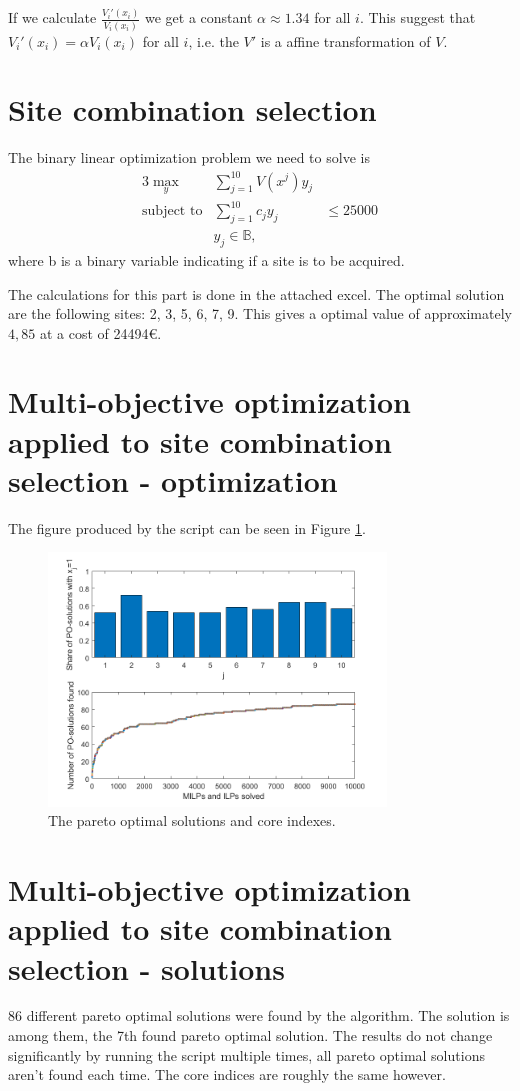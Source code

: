 \documentclass{article}
\begin{document}
	If we calculate $\frac{V_i'(x_i)}{V_i(x_i)}$ we get a constant $\alpha\approx1.34$ for all $i$. This suggest that $V_i'(x_i)=\alpha V_i(x_i)$ for all $i$, i.e. the $V'$ is a affine transformation of $V$. 
	
\section{Site combination selection}
	The binary linear optimization problem we need to solve is
	\begin{alignat}{3}
		\max_y& \sum_{j=1}^{10} V(x^j)y_j\\
		\text{subject to} & \sum_{j=1}^{10} c_jy_j &\leq 25000\\
		&y_j \in \mathbb{B},
	\end{alignat}
	where b is a binary variable indicating if a site is to be acquired. 
	
	The calculations for this part is done in the attached excel. The optimal solution are the following sites: 2, 3, 5, 6, 7, 9. This gives a optimal value of approximately $4,85$ at a cost of 24494\euro.

\section{Multi-objective optimization applied to site combination selection - optimization}
The figure produced by the script can be seen in Figure \ref{fig:8_first_run}.
	\begin{figure}[H]
		\includegraphics[width=0.8\textwidth]{8_first_run.png}
		\caption{The pareto optimal solutions and core indexes.}
		\label{fig:8_first_run}
	\end{figure}
	  

\section{Multi-objective optimization applied to site combination selection - solutions}
86 different pareto optimal solutions were found by the algorithm. The solution is among them, the 7th found pareto optimal solution. The results do not change significantly by running the script multiple times, all pareto optimal solutions aren't found each time. The core indices are roughly the same however.
\end{document}
